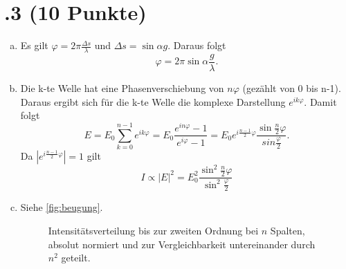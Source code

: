 \section*{\nr.3 \titthree (10 Punkte)}
\begin{enumerate}[(a)]
\item Es gilt $\varphi = 2\pi\frac{\Delta s}{\lambda}$ und $\Delta s = \sin{\alpha }g$. Daraus folgt
\begin{equation}
	\varphi = 2\pi\sin{\alpha}\frac{g}{\lambda}.
\end{equation}
\item Die k-te Welle hat eine Phasenverschiebung von $n\varphi$ (gezählt von 0 bis n-1). Daraus ergibt sich für die k-te Welle die komplexe Darstellung $e^{ik\varphi}$. Damit folgt
\begin{equation}
	E = E_0 \sum_{k=0}^{n-1} e^{ik\varphi} = E_0 \frac{e^{in\varphi} - 1}{e^{i\varphi}  - 1} = E_0 e^{i\frac{n-1}{2}\varphi}\frac{\sin{\frac{n}{2}\varphi}}{sin{\frac{\varphi}{2}}}.
\end{equation}
Da $|e^{i\frac{n-1}{2}\varphi}| = 1$ gilt
\begin{equation}
	I \propto |E|^2 = E_0^2 \frac{\sin^2{\frac{n}{2}\varphi}}{\sin^2{\frac{\varphi}{2}}}
\end{equation}
\item Siehe \autoref{fig:beugung}.
\begin{figure}[htbp]
\centering

\caption{Intensitätsverteilung bis zur zweiten Ordnung bei $n$ Spalten, absolut normiert und zur Vergleichbarkeit untereinander durch $n^2$ geteilt.}
\label{fig:beugung}
\end{figure}
\end{enumerate}
